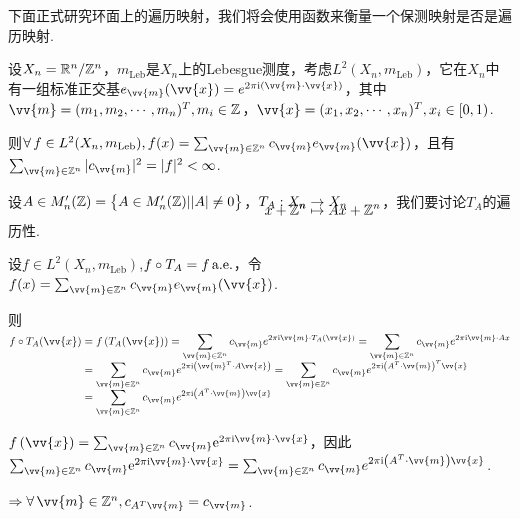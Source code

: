 下面正式研究环面上的遍历映射，我们将会使用函数来衡量一个保测映射是否是遍历映射.\par
设$X_n=\mathbb{R}^n / \mathbb{Z}^n$，$m_\mathrm{Leb}$是$X_n$上的Lebesgue测度，考虑$L^2(X_n,m_\mathrm{Leb})$，它在$X_n$中有一组标准正交基$e_{\vv{m}}(\vv{x})=e^{2\pi\iu(\vv{m}\cdot\vv{x})}$，其中$\vv{m}=(m_1,m_2,\cdots,m_n)^T,m_i\in\mb{Z}$，$\vv{x}=(x_1,x_2,\cdots,x_n)^T,x_i\in [0,1)$.\par
则$\forall\, f\in L^2(X_n,m_\mathrm{Leb}),f(x)=\sum_{\vv{m}\in\mb{Z}^n}{c_{\vv{m}}e_{\vv{m}}(\vv{x})}$，且有$\sum_{\vv{m}\in\mb{Z}^n}{|c_{\vv{m}}|^2}=|f|^2<\infty$.\par
设$A\in M'_n(\mathbb{Z})=\big\{A\in M'_n(\mathbb{Z})||A|\neq 0\big\}$，$\setjot[-6]\begin{aligned}[t]
    T_A:X_n&\to X_n \\
    x+\mb{Z}^n &\mapsto Ax+\mb{Z}^n
\end{aligned}$，我们要讨论$T_A$的遍历性.\par
设$f\in L^2(X_n,m_\mathrm{Leb})$,$f\circ T_A=f \operatorname{\text{a.e.}}$，令$f(x)=\sum_{\vv{m}\in\mb{Z}^n}{c_{\vv{m}}e_{\vv{m}}(\vv{x})}$.\par
则$\setjot[-2]\begin{aligned}[t]
    f\circ T_A(\vv{x})&=f\left(T_A(\vv{x})\right)=\sum_{\vv{m}\in\mb{Z}^n}{c_{\vv{m}}e^{2\pi \iu\vv{m}\cdot T_A(\vv{x})}}=\sum_{\vv{m}\in\mb{Z}^n}{c_{\vv{m}}e^{2\pi\iu\vv{m}\cdot Ax}}\\
    &= \sum_{\vv{m}\in\mb{Z}^n}{c_{\vv{m}}e^{2\pi\iu\left(\vv{m}^T\cdot A\vv{x}\right)}} = \sum_{\vv{m}\in\mb{Z}^n}{c_{\vv{m}}e^{2\pi\iu\left(A^T\cdot\vv{m}\right)^T\vv{x}}} \\
    &=\sum_{\vv{m}\in\mb{Z}^n}{c_{\vv{m}}e^{2\pi\iu\left(A^T\cdot\vv{m}\right)\vv{x}}}
\end{aligned}$\par
$f \left(\vv{x}\right)=\sum_{\vv{m}\in\mb{Z}^n}{c_{\vv{m}}\eu^{2\pi\iu\vv{m}\cdot\vv{x}}}$，因此$\sum_{\vv{m}\in\mb{Z}^n}{c_{\vv{m}}\eu^{2\pi\iu\vv{m}\cdot\vv{x}}}=\sum_{\vv{m}\in\mb{Z}^n}{c_{\vv{m}}e^{2\pi\iu\left(A^T\cdot\vv{m}\right)\vv{x}}}$.\par
$\Rightarrow \forall\, \vv{m}\in\mb{Z}^n,c_{A^T\vv{m}}=c_{\vv{m}}$.\par
